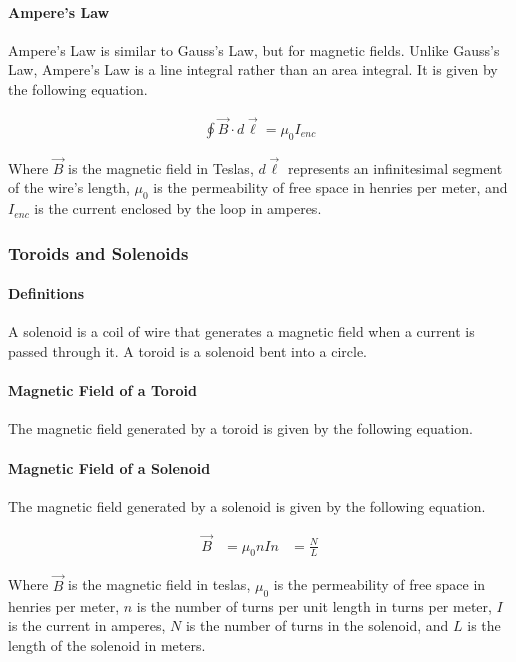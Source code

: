 \paragraph*{Ampere's Law}
Ampere's Law is similar to Gauss's Law, but for magnetic fields. Unlike Gauss's Law, Ampere's Law is a line integral rather than an area integral. 
It is given by the following equation.

\begin{align*}
    \oint \vec{B} \cdot d\vec{\ell} = \mu_0 I_{enc}
\end{align*}

Where $\vec{B}$ is the magnetic field in Teslas, $d\vec{\ell}$ represents an infinitesimal segment of the wire's length, $\mu_0$ is the 
permeability of free space in henries per meter, and $I_{enc}$ is the current enclosed by the loop in amperes.\\

\subsubsection*{Toroids and Solenoids}
\paragraph*{Definitions}
A solenoid is a coil of wire that generates a magnetic field when a current is passed through it. A toroid is a solenoid bent into a circle. 

\paragraph*{Magnetic Field of a Toroid}
The magnetic field generated by a toroid is given by the following equation.

\paragraph*{Magnetic Field of a Solenoid}
The magnetic field generated by a solenoid is given by the following equation.

\begin{align*}
    \vec{B} &= \mu_0 nI
    n &= \frac{N}{L}
\end{align*}

Where $\vec{B}$ is the magnetic field in teslas, $\mu_0$ is the permeability of free space in henries per meter, $n$ is the number of turns per
unit length in turns per meter, $I$ is the current in amperes, $N$ is the number of turns in the solenoid, and $L$ is the length of the solenoid in meters.\\

